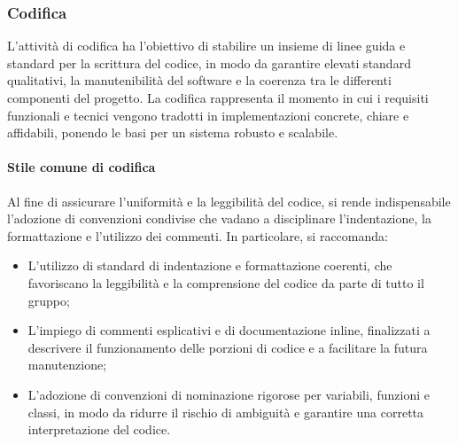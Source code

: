 \subsubsection{Codifica}
\label{subsec:codifica}
L'attività di codifica ha l'obiettivo di stabilire un insieme di linee guida e standard per la scrittura del codice, in modo da garantire elevati standard qualitativi, la manutenibilità del software e la coerenza tra le differenti componenti del progetto. La codifica rappresenta il momento in cui i requisiti funzionali e tecnici vengono tradotti in implementazioni concrete, chiare e affidabili, ponendo le basi per un sistema robusto e scalabile.

\paragraph{Stile comune di codifica}
Al fine di assicurare l'uniformità e la leggibilità del codice, si rende indispensabile l'adozione di convenzioni condivise che vadano a disciplinare l'indentazione, la formattazione e l'utilizzo dei commenti. In particolare, si raccomanda:
\begin{itemize}
    \item L'utilizzo di standard di indentazione e formattazione coerenti, che favoriscano la leggibilità e la comprensione del codice da parte di tutto il gruppo;
    \item L'impiego di commenti esplicativi e di documentazione inline, finalizzati a descrivere il funzionamento delle porzioni di codice e a facilitare la futura manutenzione;
    \item L'adozione di convenzioni di nominazione rigorose per variabili, funzioni e classi, in modo da ridurre il rischio di ambiguità e garantire una corretta interpretazione del codice.
\end{itemize}

